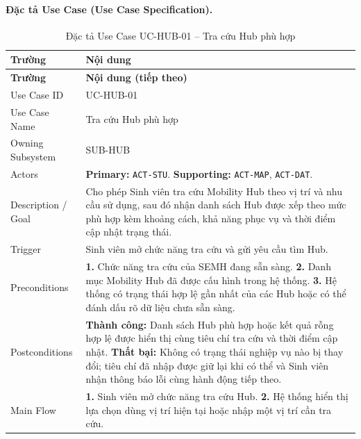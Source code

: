 \paragraph{Đặc tả Use Case (Use Case Specification).}
\small
\begin{longtable}{|L{42mm}|L{102mm}|}
  \caption{Đặc tả Use Case UC-HUB-01 -- Tra cứu Hub phù hợp}\label{tab:spec-UC-HUB-01}\\
  \hline
  \centering\arraybackslash\textbf{Trường} & \centering\arraybackslash\textbf{Nội dung}\\
  \hline
  \endfirsthead
  \hline
  \centering\arraybackslash\textbf{Trường} & \centering\arraybackslash\textbf{Nội dung (tiếp theo)}\\
  \hline
  \endhead
  Use Case ID & UC-HUB-01\\\hline
  Use Case Name & Tra cứu Hub phù hợp\\\hline
  Owning Subsystem & SUB-HUB\\\hline
  Actors & \textbf{Primary:} \texttt{ACT-STU}. \textbf{Supporting:} \texttt{ACT-MAP}, \texttt{ACT-DAT}.\\\hline
  Description / Goal & Cho phép Sinh viên tra cứu Mobility Hub theo vị trí và nhu cầu sử dụng, sau đó nhận danh sách Hub được xếp theo mức phù hợp kèm khoảng cách, khả năng phục vụ và thời điểm cập nhật trạng thái.\\\hline
  Trigger & Sinh viên mở chức năng tra cứu và gửi yêu cầu tìm Hub.\\\hline
  Preconditions &
    \textbf{1.} Chức năng tra cứu của SEMH đang sẵn sàng.\newline
    \textbf{2.} Danh mục Mobility Hub đã được cấu hình trong hệ thống.\newline
    \textbf{3.} Hệ thống có trạng thái hợp lệ gần nhất của các Hub hoặc có thể đánh dấu rõ dữ liệu chưa sẵn sàng.\\\hline
  Postconditions &
    \textbf{Thành công:} Danh sách Hub phù hợp hoặc kết quả rỗng hợp lệ được hiển thị cùng tiêu chí tra cứu và thời điểm cập nhật.\newline
    \textbf{Thất bại:} Không có trạng thái nghiệp vụ nào bị thay đổi; tiêu chí đã nhập được giữ lại khi có thể và Sinh viên nhận thông báo lỗi cùng hành động tiếp theo.\\\hline
  Main Flow &
    \textbf{1.} Sinh viên mở chức năng tra cứu Hub.\newline
    \textbf{2.} Hệ thống hiển thị lựa chọn dùng vị trí hiện tại hoặc nhập một vị trí cần tra cứu.\newline

\end{longtable}
